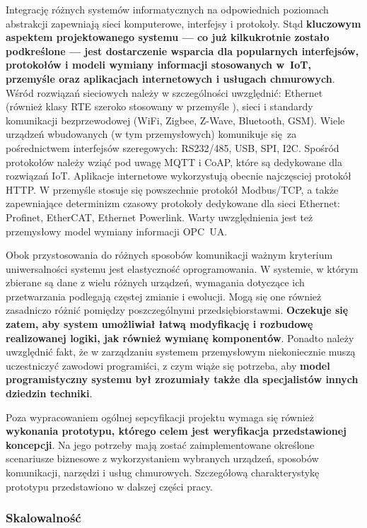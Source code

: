 \documentclass[a4paper, 12pt, twoside]{article}
\begin{document}
Integrację różnych systemów informatycznych na odpowiednich poziomach abstrakcji
zapewniają sieci komputerowe, interfejsy i protokoły.
Stąd \textbf{kluczowym aspektem projektowanego systemu --- co już kilkukrotnie zostało podkreślone ---
jest dostarczenie wsparcia dla popularnych
interfejsów, protokołów i modeli wymiany informacji stosowanych w~IoT, przemyśle oraz
aplikacjach internetowych i usługach chmurowych}. Wśród rozwiązań sieciowych
należy w szczególności uwzględnić: Ethernet (również klasy RTE szeroko stosowany
w przemyśle \cite{isp}), sieci i standardy komunikacji bezprzewodowej (WiFi, Zigbee, Z-Wave, Bluetooth, GSM).
Wiele urządzeń wbudowanych (w tym przemysłowych) komunikuje się za pośrednictwem 
interfejsów szeregowych: RS232/485, USB, SPI, I2C. Spośród protokołów należy
wziąć pod uwagę MQTT i CoAP, które są dedykowane dla rozwiązań IoT. Aplikacje
internetowe wykorzystują obecnie najczęsciej protokół HTTP. W przemyśle 
stosuje się powszechnie protokół Modbus/TCP, a także zapewniające determinizm czasowy 
protokoły dedykowane dla sieci Ethernet: Profinet, EtherCAT, Ethernet Powerlink. 
Warty uwzględnienia jest też przemysłowy model wymiany informacji OPC~UA.

Obok przystosowania do różnych sposobów komunikacji ważnym kryterium uniwersalności
systemu jest elastyczność oprogramowania.
W systemie, w którym zbierane są dane z wielu różnych urządzeń, wymagania dotyczące
ich przetwarzania podlegają częstej zmianie i ewolucji. Mogą się one również
zasadniczo różnić pomiędzy poszczególnymi przedsiębiorstawmi. \textbf{Oczekuje się zatem, 
aby system umożliwiał łatwą modyfikację i rozbudowę realizowanej logiki, jak
również wymianę komponentów}. Ponadto należy uwzględnić fakt, że w zarządzaniu
systemem przemysłowym niekoniecznie muszą uczestniczyć zawodowi programiści,
z czym wiąże się potrzeba, aby \textbf{model programistyczny systemu był zrozumiały
także dla specjalistów innych dziedzin techniki}.

Poza wypracowaniem ogólnej sepcyfikacji projektu wymaga się 
również \textbf{wykonania prototypu, którego celem jest weryfikacja przedstawionej koncepcji}.
Na jego potrzeby mają zostać zaimplementowane określone scenariusze 
biznesowe z wykorzystaniem wybranych urządzeń, sposobów komunikacji, narzędzi i 
usług chmurowych. Szczegółową charakterystykę prototypu przedstawiono w dalszej
części pracy. 

\subsubsection{Skalowalność}
\end{document}
